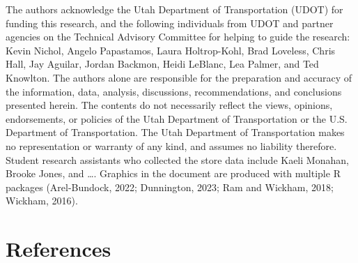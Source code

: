 \documentclass[
  letterpaper,
  DIV=11,
  numbers=noendperiod]{scrreport}
\begin{document}
The authors acknowledge the Utah Department of Transportation (UDOT) for
funding this research, and the following individuals from UDOT and
partner agencies on the Technical Advisory Committee for helping to
guide the research: Kevin Nichol, Angelo Papastamos, Laura Holtrop-Kohl,
Brad Loveless, Chris Hall, Jay Aguilar, Jordan Backmon, Heidi LeBlanc,
Lea Palmer, and Ted Knowlton. The authors alone are responsible for the
preparation and accuracy of the information, data, analysis,
discussions, recommendations, and conclusions presented herein. The
contents do not necessarily reflect the views, opinions, endorsements,
or policies of the Utah Department of Transportation or the U.S.
Department of Transportation. The Utah Department of Transportation
makes no representation or warranty of any kind, and assumes no
liability therefore. Student research assistants who collected the store
data include Kaeli Monahan, Brooke Jones, and \ldots. Graphics in the
document are produced with multiple R packages (Arel-Bundock, 2022;
Dunnington, 2023; Ram and Wickham, 2018; Wickham, 2016).


\hypertarget{references}{%
\chapter*{References}\label{references}}

\end{document}
